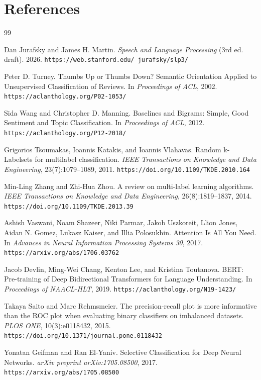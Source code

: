 \documentclass[12pt,a4paper]{article}
\begin{document}
\clearpage
\section*{References}

\begin{thebibliography}{99}

Dan Jurafsky and James H. Martin.
\textit{Speech and Language Processing} (3rd ed. draft).
2026.
\newline\texttt{https://web.stanford.edu/~jurafsky/slp3/}

Peter D. Turney.
Thumbs Up or Thumbs Down? Semantic Orientation Applied to Unsupervised Classification of Reviews.
In \textit{Proceedings of ACL}, 2002.
\newline\texttt{https://aclanthology.org/P02-1053/}

Sida Wang and Christopher D. Manning.
Baselines and Bigrams: Simple, Good Sentiment and Topic Classification.
In \textit{Proceedings of ACL}, 2012.
\newline\texttt{https://aclanthology.org/P12-2018/}

Grigorios Tsoumakas, Ioannis Katakis, and Ioannis Vlahavas.
Random k-Labelsets for multilabel classification.
\textit{IEEE Transactions on Knowledge and Data Engineering}, 23(7):1079--1089, 2011.
\newline\texttt{https://doi.org/10.1109/TKDE.2010.164}

Min-Ling Zhang and Zhi-Hua Zhou.
A review on multi-label learning algorithms.
\textit{IEEE Transactions on Knowledge and Data Engineering}, 26(8):1819--1837, 2014.
\newline\texttt{https://doi.org/10.1109/TKDE.2013.39}

Ashish Vaswani, Noam Shazeer, Niki Parmar, Jakob Uszkoreit, Llion Jones, Aidan N. Gomez, Lukasz Kaiser, and Illia Polosukhin.
Attention Is All You Need.
In \textit{Advances in Neural Information Processing Systems 30}, 2017.
\newline\texttt{https://arxiv.org/abs/1706.03762}

Jacob Devlin, Ming-Wei Chang, Kenton Lee, and Kristina Toutanova.
BERT: Pre-training of Deep Bidirectional Transformers for Language Understanding.
In \textit{Proceedings of NAACL-HLT}, 2019.
\newline\texttt{https://aclanthology.org/N19-1423/}

Takaya Saito and Marc Rehmsmeier.
The precision-recall plot is more informative than the ROC plot when evaluating binary classifiers on imbalanced datasets.
\textit{PLOS ONE}, 10(3):e0118432, 2015.
\newline\texttt{https://doi.org/10.1371/journal.pone.0118432}

Yonatan Geifman and Ran El-Yaniv.
Selective Classification for Deep Neural Networks.
\textit{arXiv preprint arXiv:1705.08500}, 2017.
\newline\texttt{https://arxiv.org/abs/1705.08500}

\end{thebibliography}
\end{document}
